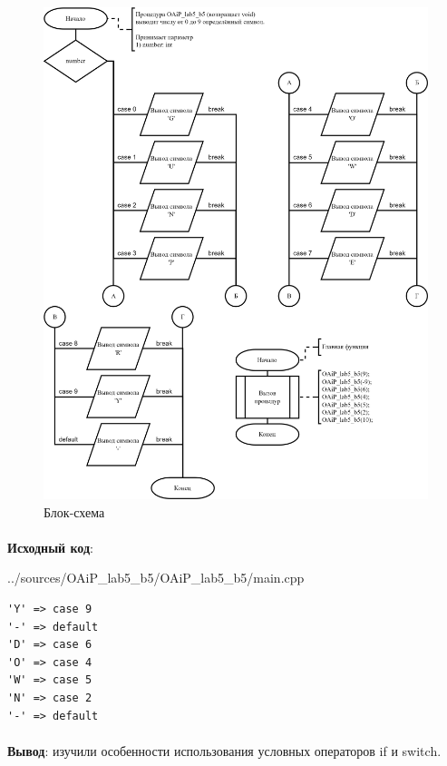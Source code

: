 \documentclass[12pt, a4paper, simple]{eskdtext}
\begin{document}
\begin{figure}[ph]
    \centering
    \includegraphics[]
    {../sources/flowcharts/OAiP_lab5_b5.png}
    \caption{Блок-схема}
    \label{fig:b5}
\end{figure}

\paragraph{} \textbf{Исходный код}: 


{../sources/OAiP_lab5_b5/OAiP_lab5_b5/main.cpp}

\begin{lstlisting}[name=Вывод в консоль]
'Y' => case 9
'-' => default
'D' => case 6
'O' => case 4
'W' => case 5
'N' => case 2
'-' => default
\end{lstlisting}


\paragraph{} \textbf{Вывод}:
изучили особенности использования условных операторов if и switch.
\end{document}
